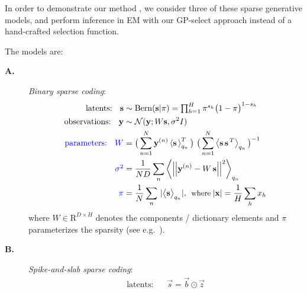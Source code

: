 %
In order to demonstrate our method , we consider three of these
 sparse generative models, and perform inference in EM with our GP-select approach instead of a hand-crafted selection function.

The models  are:
%
\begin{description}
%
\item[\textbf{A.}] \textit{Binary sparse coding}:
%
\vspace{-.1cm}
\begin{align}
\text{latents: } \,\,\,         \vec{s} &\sim \mathrm{Bern}(\vec{s} | \pi) = \disT\prod_{h=1}^H \pi^{s_h} \big( 1 - \pi \big)^{1-s_h}\nonumber \\
\text{observations:  }\,\,\,    \vec{y} &\sim \mathcal{N}(\vec{y}; W\vec{s}, \sigma^2\One)\nonumber \\ 
\rev{\text{parameters: }} \,\,\,  %
\disT{}\rev{W} &= \big( \sum_{n=1}^{N} \vec{y}^{(n)} \E{\vec{s}\,}^T_{q_n} \big)\ \big( \sum_{n=1}^{N} \left< \vec{s}\,\vec{s}^{\,T}\right>_{q_n}\big)^{-1}\, \nonumber\\
\rev{\disT{}\sigma^2} &= \frac{1}{ND} \sum_{n} \left< \left|\left| \vec{y}^{(n)} - W \, \vec{s} \right|\right|^2 \right>_{q_n}\hspace{-2mm}\nonumber\\
\rev{\pi} &= \frac{1}{N} \sum_{n}\, |\big< \vec{s} \big>_{q_n}|,\:\:\mbox{\small where}\:|\vec{x}|=\frac{1}{H}\disS\sum_{h}x_h \nonumber
\end{align}
%
where $W \in \mathrm{R}^{D \times H}$ denotes the components / dictionary elements and $\pi$ parameterizes the sparsity (see e.g.~\citep{HennigesEtAl2010}).
%
\item[\textbf{B.}] \textit{Spike-and-slab sparse coding}:
\vspace{-.2cm}
\begin{align}
\text{latents: } & \,\,\,\vec{s} = \vec{b}\odot\vec{z}

\end{align}
\end{description}
